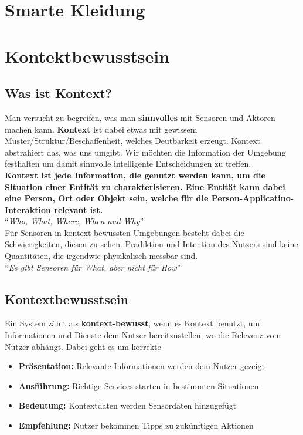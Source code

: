 \documentclass[a4paper]{article}
\begin{document}
\section{Smarte Kleidung}
\newpage
\section{Kontektbewusstsein}
\subsection{Was ist Kontext?}
Man versucht zu begreifen, was man \textbf{sinnvolles} mit Sensoren und Aktoren machen kann. \textbf{Kontext} ist dabei etwas mit gewissem Muster/Struktur/Beschaffenheit, welches Deutbarkeit erzeugt. Kontext abstrahiert das, was uns umgibt. Wir möchten die Information der Umgebung festhalten um damit sinnvolle intelligente Entscheidungen zu treffen.\\

\textbf{Kontext ist jede Information, die genutzt werden kann, um die Situation einer Entität zu charakterisieren. Eine Entität kann dabei eine Person, Ort oder Objekt sein, welche für die Person-Applicatino-Interaktion relevant ist.}\\

``\textit{Who, What, Where, When and Why}'' \\

Für Sensoren in kontext-bewussten Umgebungen besteht dabei die Schwierigkeiten, diesen zu sehen. Prädiktion und Intention des Nutzers sind keine Quantitäten, die irgendwie physikalisch messbar sind. \\

``\textit{Es gibt Sensoren für What, aber nicht für How}''

\subsection{Kontextbewusstsein}
Ein System zählt als \textbf{kontext-bewusst}, wenn es Kontext benutzt, um Informationen und Dienste dem Nutzer bereitzustellen, wo die Relevenz vom Nutzer abhängt. Dabei geht es um korrekte
\begin{itemize}
	\item \textbf{Präsentation:} Relevante Informationen werden dem Nutzer gezeigt
	\item \textbf{Ausführung:} Richtige Services starten in bestimmten Situationen
	\item \textbf{Bedeutung:} Kontextdaten werden Sensordaten hinzugefügt
	\item \textbf{Empfehlung:} Nutzer bekommen Tipps zu zukünftigen Aktionen
\end{itemize}
\end{document}

